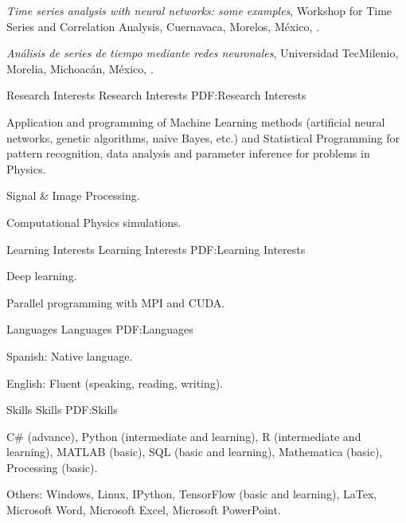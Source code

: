 \documentclass[letterpaper,MMMyyyy,nonstopmode]{simpleresumecv}
\begin{document}
\begin{Body}
\Entry
\BulletItem
{\textit{Time series analysis with neural networks: some examples},
Workshop for Time Series and Correlation Analysis,
Cuernavaca, Morelos, M\'exico,
.}

\Entry
\BulletItem
{\textit{An\'alisis de series de tiempo mediante redes neuronales}, Universidad TecMilenio,
Morelia, Michoac\'an, M\'exico,
.}




\Section
{Research Interests}
{Research Interests}
{PDF:Research Interests}

\Entry
\BulletItem
Application and programming of Machine Learning methods (artificial neural networks, genetic algorithms, naive Bayes, etc.) and Statistical Programming for pattern recognition, data analysis and parameter inference for problems in Physics.%

\Entry
\BulletItem
Signal \& Image Processing.

\Entry
\BulletItem
Computational Physics simulations.



\Section
{Learning Interests}
{Learning Interests}
{PDF:Learning Interests}

\Entry
\BulletItem
Deep learning. %

\Entry
\BulletItem
Parallel programming with MPI and CUDA.

\Section
{Languages}
{Languages}
{PDF:Languages}

\BulletItem
Spanish: Native language.

\Gap
\BulletItem
English: Fluent (speaking, reading, writing).


\Section
{Skills}
{Skills}
{PDF:Skills}

\BulletItem
C\# (advance),
Python (intermediate and learning),
R (intermediate and learning),
MATLAB (basic),
SQL (basic and learning),
Mathematica (basic),
Processing (basic).


\BulletItem
Others: 
Windows,
Linux,
IPython,
TensorFlow (basic and learning),
LaTex,
Microsoft Word,
Microsoft Excel,
Microsoft PowerPoint.



\end{Body}
\end{document}
